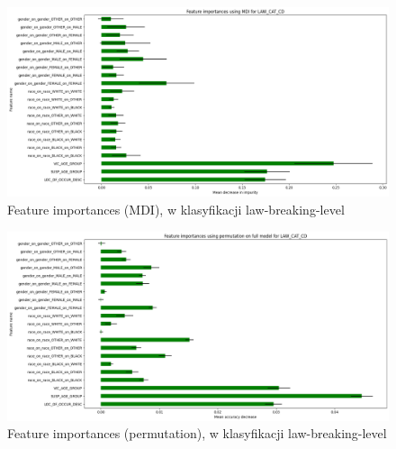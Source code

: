 \documentclass{classrep}
\begin{document}
{{{{                    \begin{figure}[!htbp]
                        \centering
                        \includegraphics[width=\textwidth]{img/5.1.3/6/Feature importances using MDI for LAW_CAT_CD.png}
                        \caption{Feature importances (MDI), w klasyfikacji law-breaking-level}
                        \label{goal_1_exp_6_imp_mdi_law}
                    \end{figure}
                    
                    \begin{figure}[!htbp]
                        \centering
                        \includegraphics[width=\textwidth]{img/5.1.3/6/Feature importances using permutation on full model for LAW_CAT_CD.png}
                        \caption{Feature importances (permutation), w klasyfikacji law-breaking-level}
                        \label{goal_1_exp_6_imp_perm_law}
                    \end{figure}
                    
}}}}
\end{document}

